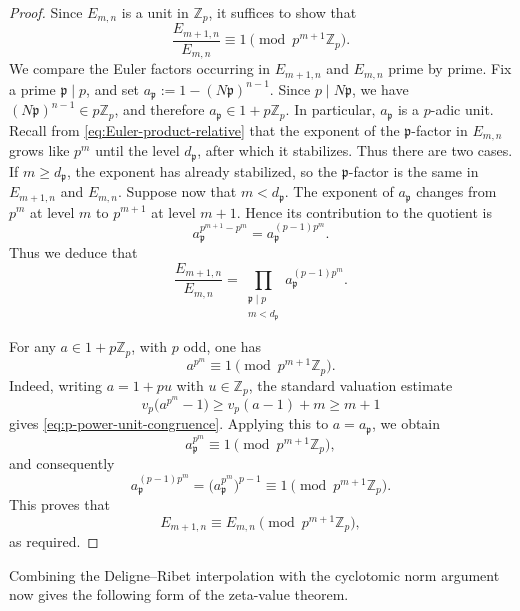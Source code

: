 \documentclass[11pt,table]{amsart}
\newcommand{\Z}{\mathbb{Z}}
\numberwithin{equation}{section}
\begin{document}
\begin{proof}
Since $E_{m,n}$ is a unit in $\Z_p$, it suffices to show that 
\[
        \frac{E_{m+1,n}}{E_{m,n}}
        \equiv
        1
        \pmod{p^{m+1}\mathbb Z_p}.
\]
We compare the Euler factors occurring in \(E_{m+1,n}\) and
\(E_{m,n}\) prime by prime. Fix a prime \(\mathfrak p\mid p\), and set $a_{\mathfrak p}
        :=
        1-(N\mathfrak p)^{n-1}$. Since \(p\mid N\mathfrak p\), we have
\((N\mathfrak p)^{n-1}\in p\mathbb Z_p\), and therefore $a_{\mathfrak p}\in 1+p\mathbb Z_p$. In particular, \(a_{\mathfrak p}\) is a \(p\)-adic unit. Recall from \eqref{eq:Euler-product-relative} that the exponent of the \(\mathfrak p\)-factor in \(E_{m,n}\)
grows like \(p^m\) until the level \(d_{\mathfrak p}\), after which it
stabilizes. Thus there are two cases. If
\(m\geq d_{\mathfrak p}\), the exponent has already stabilized, so the
\(\mathfrak p\)-factor is the same in \(E_{m+1,n}\) and \(E_{m,n}\). Suppose now that \(m<d_{\mathfrak p}\). The exponent of
\(a_{\mathfrak p}\) changes from \(p^m\) at level \(m\) to
\(p^{m+1}\) at level \(m+1\).  Hence its contribution to the quotient is
\[
        a_{\mathfrak p}^{p^{m+1}-p^m}
        =
        a_{\mathfrak p}^{(p-1)p^m}.
\]Thus we deduce that 
\[
\frac{E_{m+1,n}}{E_{m,n}}
=
\prod_{\substack{\mathfrak p\mid p\\ m<d_{\mathfrak p}}}
a_{\mathfrak p}^{(p-1)p^m}.
\]
\par For any \(a\in1+p\mathbb Z_p\), with \(p\) odd, one has
\begin{equation}\label{eq:p-power-unit-congruence}
        a^{p^m}\equiv1\pmod{p^{m+1}\mathbb Z_p}.
\end{equation}
Indeed, writing \(a=1+pu\) with \(u\in\mathbb Z_p\), the standard
valuation estimate
\[
        v_p\bigl(a^{p^m}-1\bigr)
        \geq v_p(a-1)+m
        \geq m+1
\]
gives \eqref{eq:p-power-unit-congruence}. Applying this to \(a=a_{\mathfrak p}\), we obtain
\[
        a_{\mathfrak p}^{p^m}
        \equiv1\pmod{p^{m+1}\mathbb Z_p},
\]
and consequently
\[
        a_{\mathfrak p}^{(p-1)p^m}
        =
        \bigl(a_{\mathfrak p}^{p^m}\bigr)^{p-1}
        \equiv1\pmod{p^{m+1}\mathbb Z_p}.
\]
This proves that
\[
        E_{m+1,n}
        \equiv
        E_{m,n}
        \pmod{p^{m+1}\mathbb Z_p},
\]
as required.
\end{proof}


Combining the Deligne--Ribet interpolation with the cyclotomic norm
argument now gives the following form of the zeta-value theorem.
\end{document}
